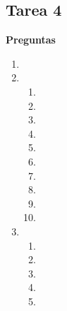 \documentclass{report}
\begin{document}
	
	
	
	\begin{center}
		\section*{\LARGE{Tarea 4}}
	\end{center}

    \begin{center}
        \LARGE{\textbf{Preguntas}}\\
    \end{center}
    \normalsize
    
    \begin{enumerate}%
        \item 
        \item    
        \begin{enumerate}[label=\alph*.]
            \item  
            \item 
            \item 
            \item 
            \item 
            \item 
            \item 
            \item 
            \item 
            \item 
        \end{enumerate}
        \item 
        \begin{enumerate}[label=\alph*.]
            \item  
            \item 
            \item 
            \item 
            \item 
        \end{enumerate}
    \end{enumerate}
    \newpage
    
\printbibliography
  
\end{document}
